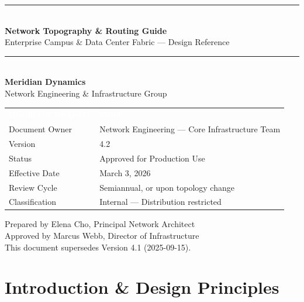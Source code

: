 \documentclass[11pt,a4paper]{report}
\renewcommand{\arraystretch}{1.25}
\newcommand{\thd}[1]{\textcolor{white}{\textbf{#1}}}
\begin{document}
\begin{titlepage}
\centering
\vspace*{0.8cm}
{\color{teal}\rule{\linewidth}{2.2pt}}\\[0.45cm]
{\Huge\bfseries\color{navy} Network Topography \& Routing Guide}\\[0.35cm]
{\Large\color{slategray} Enterprise Campus \& Data Center Fabric --- Design Reference}\\[0.5cm]
{\color{teal}\rule{\linewidth}{2.2pt}}\\[1.6cm]

{\LARGE\bfseries\color{navy} Meridian Dynamics}\\[0.25cm]
{\large\color{slategray} Network Engineering \& Infrastructure Group}\\[2.0cm]

\begin{minipage}{0.72\linewidth}
\centering
\renewcommand{\arraystretch}{1.4}
\begin{tabularx}{\linewidth}{@{}l X@{}}
\rowcolor{navy}
\thd{Document Property} & \thd{Value} \\
Document Owner        & Network Engineering --- Core Infrastructure Team \\
Version                & 4.2 \\
Status                 & Approved for Production Use \\
Effective Date         & March 3, 2026 \\
Review Cycle           & Semiannual, or upon topology change \\
Classification         & Internal --- Distribution restricted \\
\end{tabularx}
\end{minipage}

\vfill
{\small\color{slategray} Prepared by Elena Cho, Principal Network Architect \\
Approved by Marcus Webb, Director of Infrastructure \\[0.3cm]
This document supersedes Version 4.1 (2025-09-15).}
\end{titlepage}

\tableofcontents
\newpage

\chapter{Introduction \& Design Principles}
\end{document}
